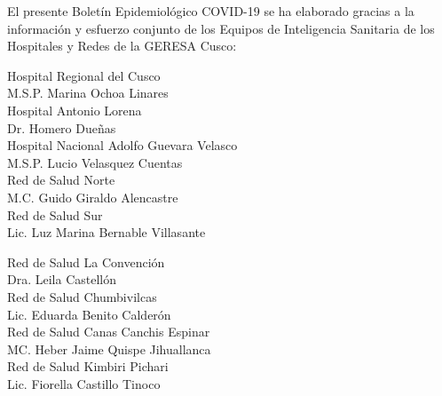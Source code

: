 \documentclass[12pt,a4paper,openany]{book}
\begin{document}
	\centering
	{\large El presente Boletín Epidemiológico COVID-19 se ha elaborado gracias a la información y esfuerzo conjunto de los Equipos de Inteligencia Sanitaria de los Hospitales y Redes de la GERESA Cusco:
		
		\vspace{0.5cm}
		\noindent
		\begin{minipage}[t]{.45\textwidth}
			\centering
			Hospital Regional del Cusco \\
			M.S.P. Marina Ochoa Linares \vspace{0.5cm}\\
			Hospital Antonio Lorena \\
			Dr. Homero Dueñas \vspace{.5cm}\\
			Hospital Nacional Adolfo Guevara Velasco\\
			M.S.P. Lucio Velasquez Cuentas \vspace{.5cm}\\
			Red de Salud Norte \\
			M.C. Guido Giraldo Alencastre\vspace{0.5cm}\\
			Red de Salud Sur\\
			Lic. Luz Marina Bernable Villasante \vspace{0.5cm}\\	
		\end{minipage}
		\hfill
		\noindent
		\begin{minipage}[t]{.45\textwidth}
			\centering
			Red de Salud La Convención\\
			Dra. Leila  Castellón \vspace{0.5cm}\\
			Red de Salud Chumbivilcas\\
			Lic. Eduarda Benito Calderón \vspace{.5cm}\\
			Red de Salud Canas Canchis Espinar\\
			MC. Heber Jaime Quispe Jihuallanca \vspace{.5cm}\\
			Red de Salud Kimbiri Pichari \\
			Lic. Fiorella Castillo Tinoco\vspace{0.5cm}\\	
		\end{minipage}
}
\end{document}
